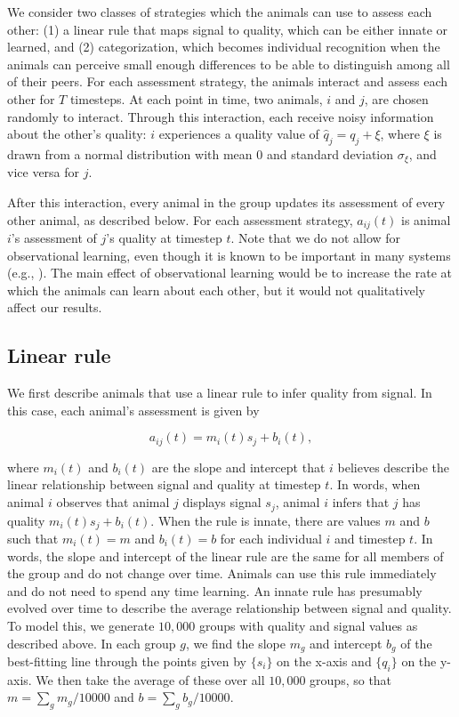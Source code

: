 We consider two classes of strategies which the animals can use to assess each other: (1) a linear rule that maps signal to quality, which can be either innate or learned, and (2) categorization, which becomes individual recognition when the animals can perceive small enough differences to be able to distinguish among all of their peers. For each assessment strategy, the animals interact and assess each other for $T$ timesteps. At each point in time, two animals, $i$ and $j$, are chosen randomly to interact. Through this interaction, each receive noisy information about the other's quality: $i$ experiences a quality value of $\hat{q}_j=q_j+\xi$, where $\xi$ is drawn from a normal distribution with mean $0$ and standard deviation $\sigma_\xi$, and vice versa for $j$. 

After this interaction, every animal in the group updates its assessment of every other animal, as described below. For each assessment strategy, $a_{ij}(t)$ is animal $i$'s assessment of $j$'s quality at timestep $t$. Note that we do not allow for observational learning, even though it is known to be important in many systems (e.g., \citep{Freeman:1985kl,Holekamp:1991nx,Schaik:2011oq,Hobson:2015uq,Seyfarth2015SocialCognition}). The main effect of observational learning would be to increase the rate at which the animals can learn about each other, but it would not qualitatively affect our results. 


\subsection*{Linear rule}
We first describe animals that use a linear rule to infer quality from signal. In this case, each animal's assessment is given by
\begin{linenomath*}
\begin{equation*}
a_{ij}(t)=m_i(t)s_j+b_i(t),
\end{equation*}
\end{linenomath*}
where $m_i(t)$ and $b_i(t)$ are the slope and intercept that $i$ believes describe the linear relationship between signal and quality at timestep $t$. In words, when animal $i$ observes that animal $j$ displays signal $s_j$, animal $i$ infers that $j$ has quality $m_i(t)s_j+b_i(t)$. When the rule is innate, there are values $m$ and $b$ such that $m_i(t)=m$ and $b_i(t)=b$ for each individual $i$ and timestep $t$. In words, the slope and intercept of the linear rule are the same for all members of the group and do not change over time. Animals can use this rule immediately and do not need to spend any time learning.  An innate rule has presumably evolved over time to describe the average relationship between signal and quality. To model this, we generate $10,000$ groups with quality and signal values as described above. In each group $g$, we find the slope $m_{g}$ and intercept $b_{g}$ of the best-fitting line through the points given by $\{s_i\}$ on the x-axis and $\{q_i\}$ on the y-axis. We then take the average of these over all $10,000$ groups, so that $m=\sum_{g} m_{g}/10000$ and $b=\sum_{g}b_{g}/10000$. 

